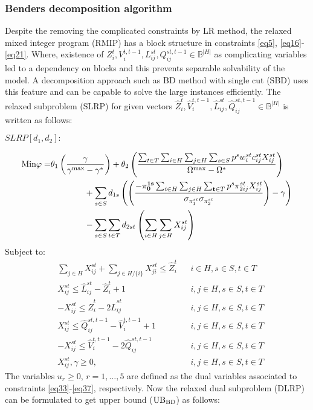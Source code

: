 \documentclass[review]{elsarticle}
\begin{document}
\subsubsection{Benders decomposition algorithm}

Despite the removing the complicated constraints by LR method, the relaxed mixed integer program (RMIP) has a block structure in constraints \eqref{eq5}, \eqref{eq16}-\eqref{eq21}. Where, existence of $Z^t_i, V^{t,t-1}_i, L^{st}_{ij}, Q^{st,t-1}_{ij}\in {\mathbb{ B}}^{\left|H\right|}$ as complicating variables led to a dependency on blocks and this prevents separable solvability of the model. A decomposition approach such as BD method with single cut (SBD) uses this feature and can be capable to solve the large instances efficiently. The relaxed subproblem (SLRP) for given vectors ${\hat{Z}}^t_i, {\hat{V}}^{t,t-1}_i, {\hat{L}}^{st}_{ij}, {\hat{Q}}^{st,t-1}_{ij}\in {\mathbb{ B}}^{\left|H\right|}$ is written as follows:

$SLRP[d_{1} ,d_{2}]:$

\begin{align}
{\rm Min} \varphi= &{\theta }_1\left(\frac{\gamma }{{\gamma }^{\max}-{\gamma }^*}\right)+{\theta }_2\left(\frac{\sum_{t\in T}\sum_{i\in H}\sum_{j\in H}\sum_{s\in S}p^sw^{st}_i c^{st}_{ij}X^{st}_{ij}}{{\Omega }^{\max}-{\Omega }^*}\right)\label{eq32}\\
&\qquad\qquad +\sum_{s\in S}{d_{1s}}\left(\left(\frac{\mathbf{ -}{\mathbf{ \pi }}^{\mathbf{ 1}\mathbf{ s}}_{\mathbf{ 0}}\sum_{i\in H}{\sum_{j\in H}{\sum_{\mathbf{ t}\in T}{p^s{\pi }^{st}_{2ij}X^{st}_{ij}}}}}{{\sigma }_{{\pi }^{st}_{1}}{\sigma }_{{\pi }^{st}_{2}}}\right)-\gamma \right)\nonumber\\
&\qquad\qquad -\sum_{s\in S}{\sum_{t\in T}{d_{2st}\left(\sum_{i\in H}{\sum_{j\in H}{X^{st}_{ij}}} \right)}}\nonumber
\end{align}
Subject to:
\begin{align}
&\sum_{j\in H}{X^{st}_{ij}}+\sum_{j\in H/\{i\}}{X^{st}_{ji}}\leq {\hat{Z}}^t_i&&i\in H, s\in S, t\in T\label{eq33}\\
&X^{st}_{ij}\leq {\hat{L}}^{st}_{ij}-{\hat{Z}}^t_i+1&&i,j\in H, s\in S, t\in T\label{eq34}\\
&{-X}^{st}_{ij}\leq {\hat{Z}}^t_i-2{\hat{L}}^{st}_{ij}&&i,j\in H, s\in S, t\in T\label{eq35}\\
& X^{st}_{ij}\leq {\hat{Q}}^{st,t-1}_{ij}-{\hat{V}}^{t,t-1}_i+1&&i,j\in H, s\in S, t\in T\label{eq36}\\
&-X^{st}_{ij}\le {\hat{V}}^{t,t-1}_i-2{\hat{Q}}^{st,t-1}_{ij}&&i,j\in H, s\in S, t\in T\label{eq37}\\
&X^{st}_{ij}, \gamma \geq 0,&&i,j\in H, s\in S, t\in T\nonumber
\end{align}
The variables $u_{r} \geq 0$, $r=1,\ldots,5$ are defined as the dual variables associated to constraints \eqref{eq33}-\eqref{eq37}, respectively. Now the relaxed dual subproblem (DLRP) can be formulated to get upper bound (${\rm UB_{BD}}$) as follows:
\end{document}
